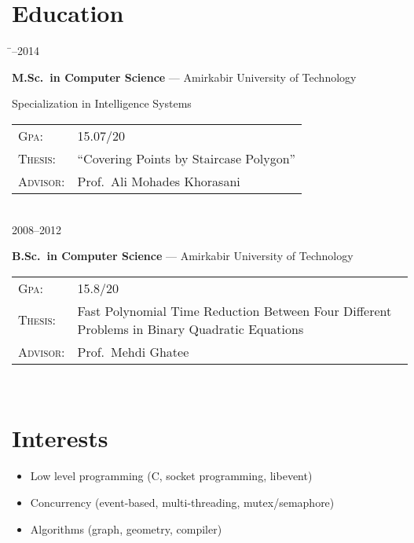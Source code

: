 \documentclass[a4paper,10pt]{article}
\newcommand{\follownote}[1]{--- {\footnotesize\color{darkblue}#1}}
\begin{document}
\section*{{\color{red}Education}}
\begin{tabbing}
\hspace{2.5cm}\=--2014 \>\parbox[t]{10.5cm}{
	\textbf{M.Sc.\ in Computer Science}
	\follownote{Amirkabir University of Technology}

	Specialization in Intelligence Systems

	\begin{tabular}{p{1.5cm}p{8cm}}
	\textsc{Gpa}: & 15.07/20 \\
	\textsc{Thesis}: & ``Covering Points by Staircase Polygon'' \\
	\textsc{Advisor}: & Prof.\ Ali Mohades Khorasani
	\end{tabular}
} \\[2mm]
2008--2012 \>\parbox[t]{10.5cm}{
	\textbf{B.Sc.\ in Computer Science}
	\follownote{Amirkabir University of Technology}

	\begin{tabular}{p{1.5cm}p{8cm}}
	\textsc{Gpa}: & 15.8/20 \\
	\textsc{Thesis}: & Fast Polynomial Time Reduction
	    Between Four Different Problems in Binary Quadratic
	    Equations \\
	\textsc{Advisor}: & Prof.\ Mehdi Ghatee
	\end{tabular}
} \\[2mm]
\end{tabbing}

\section*{{\color{blue}Interests}}
\begin{itemize}
	\item Low level programming (C, socket programming, libevent)
	\item Concurrency (event-based, multi-threading, mutex/semaphore)
	\item Algorithms (graph, geometry, compiler)
\end{itemize}
\end{document}
